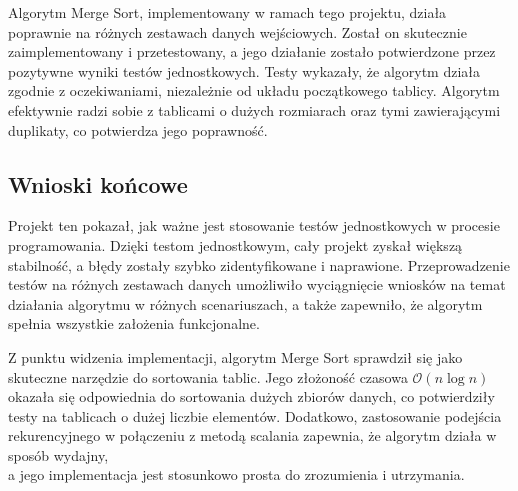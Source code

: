 Algorytm Merge Sort, implementowany w ramach tego projektu, działa poprawnie na różnych zestawach danych wejściowych.
Został on skutecznie zaimplementowany i przetestowany, a jego działanie zostało potwierdzone przez pozytywne wyniki testów jednostkowych.
Testy wykazały, że algorytm działa zgodnie z oczekiwaniami, niezależnie od układu początkowego tablicy.
Algorytm efektywnie radzi sobie z tablicami o dużych rozmiarach oraz tymi zawierającymi duplikaty, co potwierdza jego poprawność.

\subsection{Wnioski końcowe}

Projekt ten pokazał, jak ważne jest stosowanie testów jednostkowych w procesie programowania.
Dzięki testom jednostkowym, cały projekt zyskał większą stabilność, a błędy zostały szybko zidentyfikowane i naprawione.
Przeprowadzenie testów na różnych zestawach danych umożliwiło wyciągnięcie wniosków na temat działania algorytmu w różnych scenariuszach, a także zapewniło,
że algorytm spełnia wszystkie założenia funkcjonalne.

Z punktu widzenia implementacji,
algorytm Merge Sort sprawdził się jako skuteczne narzędzie do sortowania tablic.
Jego złożoność czasowa \(\mathcal{O}(n \log n)\) okazała się odpowiednia do sortowania dużych zbiorów danych,
co potwierdziły testy na tablicach o dużej liczbie elementów. Dodatkowo, zastosowanie podejścia rekurencyjnego w połączeniu z metodą scalania zapewnia,
że algorytm działa w sposób wydajny, \\ a jego implementacja jest stosunkowo prosta do zrozumienia i utrzymania.
